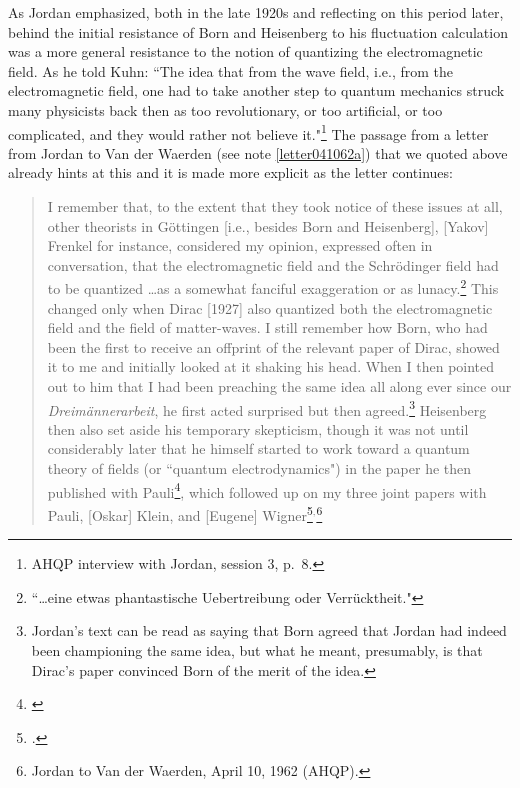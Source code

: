 \documentclass{elsart}
\begin{document}
As Jordan emphasized, both in the late 1920s and reflecting on this period later, behind the initial resistance of Born and Heisenberg to his fluctuation calculation was a more general resistance to the notion of quantizing the electromagnetic field. As he told Kuhn: ``The idea that from the wave field, i.e., from the electromagnetic field, one had to take another step to quantum mechanics struck many physicists back then as too revolutionary, or too artificial, or too complicated, and they would rather not believe it."\footnote{AHQP interview with Jordan, session 3, p.\ 8.} The passage from a letter from Jordan to Van der Waerden (see note \ref{letter041062a}) that we quoted above already hints at this and it is made more explicit as the letter continues:
\begin{quotation}
I remember that, to the extent that they took notice of these issues at all, other theorists in G\"ottingen [i.e., besides Born and Heisenberg], [Yakov] Frenkel for instance,  considered my opinion, expressed often in conversation, that the electromagnetic field and the Schr\"odinger field had to be quantized \ldots  as a somewhat fanciful exaggeration or as lunacy.\footnote{``\ldots eine etwas phantasti\-sche Uebertreibung oder Verr\"ucktheit."} This changed only when Dirac [1927] also quantized both the electromagnetic field and the field of matter-waves. I still remember how Born, who had been the first to receive an offprint of the relevant paper of Dirac, showed it to me and initially looked at it shaking his head. When I then pointed out to him that I had been preaching the same idea all along ever since our {\it Dreim\"annerarbeit}, he first acted surprised but then agreed.\footnote{Jordan's text can be read as saying that Born agreed that Jordan had indeed been championing the same idea, but what he meant, presumably, is that Dirac's paper convinced Born of the merit of the idea.} Heisenberg then also set aside his temporary skepticism, though it was not until considerably later that he himself started to work toward a quantum theory of fields (or ``quantum electrodynamics") in the paper he then published with Pauli\footnote{\citep{Heisenberg and Pauli 1929, Heisenberg and Pauli 1930}}, which followed up on my three joint papers with Pauli, [Oskar] Klein, and [Eugene] Wigner\footnote{\citep{Jordan and Pauli 1928, Jordan and Klein 1927, Jordan and Wigner 1928}. }$^,$\footnote{Jordan to Van der Waerden, April 10, 1962 (AHQP).} 
\end{quotation}
\end{document}
